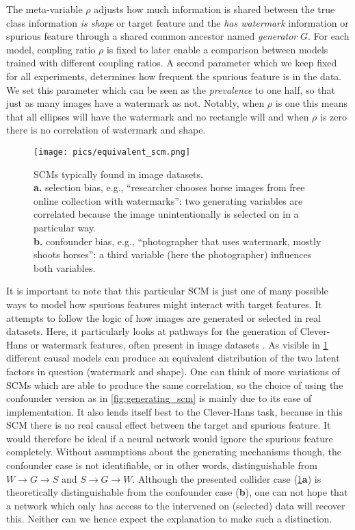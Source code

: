 The meta-variable $\rho$ adjusts how much information is shared between the true class information \textit{is shape} or target feature and the \textit{has watermark} information or spurious feature through a shared common ancestor named \textit{generator} $G$. For each model, coupling ratio $\rho$ is fixed to later enable a comparison between models trained with different coupling ratios. 
A second parameter which we keep fixed for all experiments, determines how frequent the spurious feature is in the data. We set this parameter which can be seen as the \textit{prevalence} to one half, so that just as many images have a watermark as not. Notably, when $\rho$ is one this means that all ellipses will have the watermark and no rectangle will and when $\rho$ is zero there is no correlation of watermark and shape. 

\begin{figure}[t!]
    \centering
    \texttt{[image: pics/equivalent\_scm.png]}
    \caption[Selection and Confounder Bias]{SCMs typically found in image datasets.\\
    \textbf{a.} selection bias, e.g., ``researcher chooses horse images from free online collection with watermarks'': two generating variables are correlated because the image unintentionally is selected on in a particular way. \\
    \textbf{b.} confounder bias, e.g., ``photographer that uses watermark, mostly shoots horses'': a third variable (here the photographer) influences both variables. }
    \label{fig:equivalent_scm}
\end{figure}

It is important to note that this particular SCM is just one of many possible ways to model how spurious features might interact with target features. It attempts to follow the logic of how images are generated or selected in real datasets. Here, it particularly looks at pathways for the generation of Clever-Hans or watermark features, often present in image datasets \citep{Lapuschkin2019}. As visible in \cref{fig:equivalent_scm} different causal models can produce an equivalent distribution of the two latent factors in question (watermark and shape). One can think of more variations of SCMs which are able to produce the same correlation, so the choice of using the confounder version as in \cref{fig:generating_scm} is mainly due to its ease of implementation. It also lends itself best to the Clever-Hans task, because in this SCM there is no real causal effect between the target and spurious feature. It would therefore be ideal if a neural network would ignore the spurious feature completely. Without assumptions about the generating mechanisms though, the confounder case is not identifiable, or in other words, distinguishable from $W \rightarrow G \rightarrow S$ and $S \rightarrow G \rightarrow W$. 
Although the presented collider case (\cref{fig:equivalent_scm}\textbf{a}) is theoretically distinguishable from the confounder case (\textbf{b}), one can not hope that a network which only has access to the intervened on (selected) data will recover this. Neither can we hence expect the explanation to make such a distinction.

